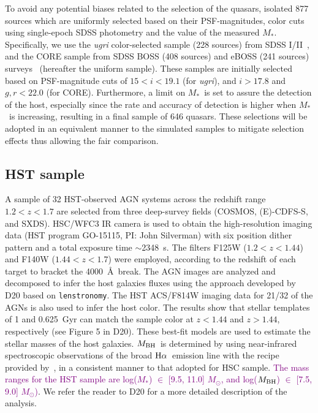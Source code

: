 \documentclass[twocolumn]{aastex631}
\newcommand{\red}[1]{\textcolor{purple}{#1}}
\def\smass{{$M_*$}}
\def\halpha{${\rm H}\alpha$}
\def\mbh{$M_{\rm BH}$}
\begin{document}
To avoid any potential biases related to the selection of the quasars, \citet{2021arXiv210902751L} isolated 877 sources which are uniformly selected based on their PSF-magnitudes, color cuts using single-epoch SDSS photometry and the value of the measured \smass. Specifically, we use the {\it ugri} color-selected sample (228 sources) from SDSS I/II~\citep{Richards2002}, and the CORE sample from SDSS BOSS (408 sources) and eBOSS (241 sources) surveys~\citep{Ross2013, Myers2015} (hereafter the uniform sample). These samples are initially selected based on PSF-magnitude cuts of $15 < i < 19.1$ (for {\it ugri}), and $i > 17.8$ and $g, r < 22.0$ (for CORE). Furthermore, a limit on \smass\ is set to assure the detection of the host, especially since the rate and accuracy of detection is higher when \smass\ is increasing, resulting in a final sample of 646 quasars. These selections will be adopted in an equivalent manner to the simulated samples to mitigate selection effects thus allowing the fair comparison.

\subsection{HST sample}

A sample of 32 HST-observed AGN systems across the redshift range $1.2<z<1.7$ are selected from three deep-survey fields (COSMOS, (E)-CDFS-S, and SXDS). HSC/WFC3 IR camera is used to obtain the high-resolution imaging data (HST program GO-15115, PI: John Silverman) with six position dither pattern and a total exposure time $\sim$2348~s. The filters F125W ($1.2<z<1.44$) and F140W ($1.44<z<1.7$) were employed, according to the redshift of each target to bracket the 4000~\AA~break.  The AGN images are analyzed and decomposed to infer the host galaxies fluxes using the approach developed by D20 based on {\tt lenstronomy}. The HST ACS/F814W imaging data for 21/32 of the AGNs is also used to infer the host color. The results show that stellar templates of 1 and 0.625~Gyr can match the sample color at $z<1.44$ and $z>1.44$, respectively (see Figure 5 in D20). These best-fit models are used to estimate the stellar masses of the host galaxies. \mbh\ is determined by \citet{Schulze2018} using near-infrared spectroscopic observations of the broad \halpha\ emission line with the recipe provided by~\citet{Vestergaard2006}, in a consistent manner to that adopted for HSC sample. \red{The mass ranges for the HST sample are log(\smass) $\in$ [9.5, 11.0] $M_{\odot}$, and log(\mbh) $\in$  [7.5, 9.0] $M_{\odot}$)}.
 We refer the reader to D20 for a more detailed description of the analysis. 
\end{document}
